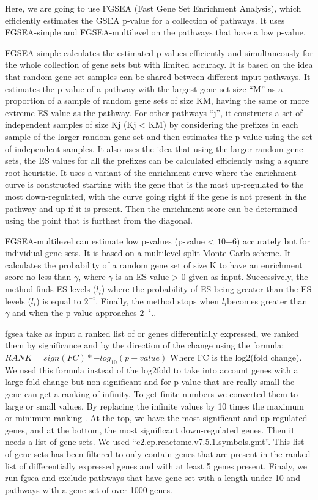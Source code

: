 \documentclass[a4paper, 11pt]{article}
\begin{document}
\begin{multicols}{2}
Here, we are going to use FGSEA (Fast Gene Set Enrichment Analysis), which efficiently estimates the GSEA p-value for a collection of pathways. It uses FGSEA-simple and FGSEA-multilevel on the pathways that have a low p-value.

FGSEA-simple calculates the estimated p-values efficiently and simultaneously for the whole collection of gene sets but with limited accuracy. It is based on the idea that random gene set samples can be shared between different input pathways. It estimates the p-value of a pathway with the largest gene set size “M” as a proportion of a sample of random gene sets of size KM, having the same or more extreme ES value as the pathway. For other pathways “j”, it constructs a set of independent samples of size Kj (Kj < KM) by considering the prefixes in each sample of the larger random gene set and then estimates the p-value using the set of independent samples. It also uses the idea that using the larger random gene sets, the ES values for all the prefixes can be calculated efficiently using a square root heuristic. It uses a variant of the enrichment curve where the enrichment curve is constructed starting with the gene that is the most up-regulated to the most down-regulated, with the curve going right if the gene is not present in the pathway and up if it is present. Then the enrichment score can be determined using the point that is furthest from the diagonal.

FGSEA-multilevel can estimate low p-values (p-value < $10{-6}$) accurately but for individual gene sets. It is based on a multilevel split Monte Carlo scheme. It calculates the probability of a random gene set of size K to have an enrichment score no less than $\gamma$, where $\gamma$ is an ES value > 0 given as input. Successively, the method finds ES levels ($l_i$) where the probability of ES being greater than the ES levels ($l_i$) is equal to $2^{-i}$. Finally, the method stops when $ l_i $becomes greater than $\gamma$ and when the p-value approaches $2^{-i}$.\citep{korotkevich2016fast}.

fgsea take as input a ranked list of or genes differentially expressed, we ranked them by significance and by the direction of the change using the formula:
\bigskip
 $ RANK =sign(FC)* -log_{10}(p-value)  $
\bigskip
Where FC is the log2(fold change).
We used this formula instead of the log2fold to take into account genes with a large fold change but non-significant and for p-value that are really small the gene can get a ranking of infinity. To get finite numbers we converted them to large or small values. By replacing the infinite values by 10 times the maximum or minimum ranking .
 At the top, we have the most significant and up-regulated genes, and at the bottom, the most significant down-regulated genes. Then it needs a list of gene sets. We used “c2.cp.reactome.v7.5.1.symbols.gmt”. This list of gene sets has been filtered to only contain genes  that are present in the ranked list of differentially expressed genes and with at least 5 genes present. Finaly, we run fgsea  \citep{fgsea} and exclude pathways that have gene set with a length under 10 and pathways with a gene set of over 1000 genes.
 

\end{multicols}
\end{document}
